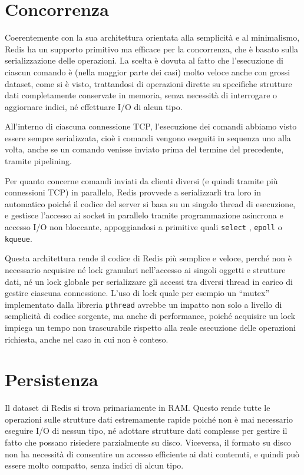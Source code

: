 \section{Concorrenza}
\label{sec:concurrency}

Coerentemente con la sua architettura orientata alla semplicità e al minimalismo, Redis ha un
supporto primitivo ma efficace per la concorrenza, che è basato sulla serializzazione delle
operazioni. La scelta è dovuta al fatto che l'esecuzione di ciascun comando è (nella maggior parte
dei casi) molto veloce anche con grossi dataset, come si è visto, trattandosi di operazioni dirette
su specifiche strutture dati completamente conservate in memoria, senza necessità di interrogare o
aggiornare indici, né effettuare I/O di alcun tipo.

All'interno di ciascuna connessione TCP, l'esecuzione dei comandi abbiamo visto essere sempre
serializzata, cioè i comandi vengono eseguiti in sequenza uno alla volta, anche se un comando
venisse inviato prima del termine del precedente, tramite pipelining.

Per quanto concerne comandi inviati da clienti diversi (e quindi tramite più connessioni TCP) in
parallelo, Redis provvede a serializzarli tra loro in automatico poiché il codice del server si
basa su un singolo thread di esecuzione, e gestisce l'accesso ai socket in parallelo tramite
programmazione asincrona e accesso I/O non bloccante, appoggiandosi a primitive quali \verb|select| 
\cite{select}, \verb|epoll| \cite{epoll} o \verb|kqueue|.

Questa architettura rende il codice di Redis più semplice e veloce, perché non è necessario
acquisire né lock granulari nell'accesso ai singoli oggetti e strutture dati, né un lock globale per
serializzare gli accessi tra diversi thread in carico di gestire ciascuna connessione. L'uso di lock
quale per esempio un ``mutex'' implementato dalla libreria \verb|pthread| avrebbe un impatto non
solo a livello di semplicità di codice sorgente, ma anche di performance, poiché acquisire un lock
impiega un tempo non trascurabile rispetto alla reale esecuzione delle operazioni richiesta, anche
nel caso in cui non è conteso.

\section{Persistenza}
\label{sec:persistence}

Il dataset di Redis si trova primariamente in RAM. Questo rende tutte le operazioni sulle strutture
dati estremamente rapide poiché non è mai necessario eseguire I/O di nessun tipo, né adottare
strutture dati complesse per gestire il fatto che possano risiedere parzialmente su disco.
Viceversa, il formato su disco non ha necessità di consentire un accesso efficiente ai dati
contenuti, e quindi può essere molto compatto, senza indici di alcun tipo.

